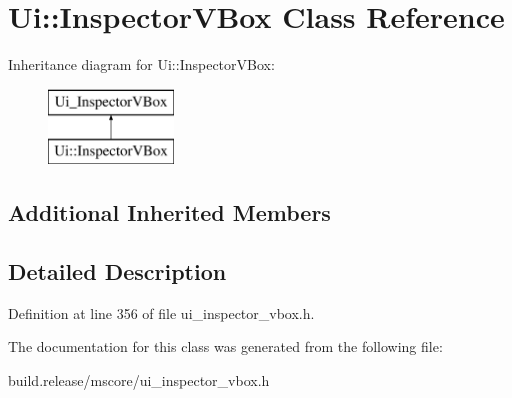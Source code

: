 \hypertarget{class_ui_1_1_inspector_v_box}{}\section{Ui\+:\+:Inspector\+V\+Box Class Reference}
\label{class_ui_1_1_inspector_v_box}
Inheritance diagram for Ui\+:\+:Inspector\+V\+Box\+:\begin{figure}[H]
\begin{center}
\leavevmode
\includegraphics[height=2.000000cm]{class_ui_1_1_inspector_v_box}
\end{center}
\end{figure}
\subsection*{Additional Inherited Members}


\subsection{Detailed Description}


Definition at line 356 of file ui\+\_\+inspector\+\_\+vbox.\+h.



The documentation for this class was generated from the following file\+:\begin{DoxyCompactItemize}
\item 
build.\+release/mscore/ui\+\_\+inspector\+\_\+vbox.\+h\end{DoxyCompactItemize}

